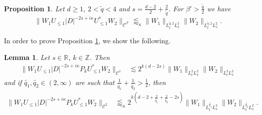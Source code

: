 \documentclass[a4paper]{amsart}
\numberwithin{equation}{section}%
\theoremstyle{plain}%
\newtheorem{lemma}[theorem]{Lemma}
\newtheorem{proposition}[theorem]{Proposition}
\theoremstyle{definition}
\theoremstyle{remark}%
\def\C{\mathcal{C}}
\def\C{\mathcal{C}}
\begin{document}
\begin{proposition}
\label{prop:Proposition_4.1}
Let $d\geq1$, $2<\widetilde{q}<4$ and $s=\frac{d-2}{2}+\frac{2}{\widetilde{q}}$. For $\beta'>\frac{\widetilde{q}}{2}$ we have 
\begin{equation*}
    \|W_1U_{\leq 1}|D|^{-2s+i\kappa}U_{\leq 1}^*W_2\|_{\C^{\beta'}}
\lessapprox_\kappa
    \|W_1\|_{L_t^{\widetilde{q},2}L_x^2}\|W_2\|_{L_t^{\widetilde{q},2}L_x^2}.
\end{equation*}
\end{proposition}
In order to prove Proposition \ref{prop:Proposition_4.1}, we show the following.
\begin{lemma} \label{l:freqlocal}
Let $s \in \mathbb{R}$, $k \in \mathbb{Z}$. Then 
\begin{align}\label{i:C1 loc}
    \|W_1U_{\leq 1}|D|^{-2s+i\kappa}P_kU_{\leq 1}^*W_2\|_{\C^1}
    & \lesssim
    2^{k(d-2s)}
    \|W_1\|_{L_t^{2}L_x^2}\|W_2\|_{L_t^{2}L_x^2}
\end{align}
and if $\widetilde{q_1},\widetilde{q_2}\in (2,\infty)$ are such that $\frac{1}{\widetilde{q_1}}+\frac{1}{\widetilde{q_2}}>\frac12$, then
\begin{align}\label{i:C2 loc}
    \|W_1U_{\leq 1}|D|^{-2s+i\kappa}P_kU_{\leq 1}^*W_2\|_{\C^2}
    & \lessapprox_\kappa
    2^{k(d-2+\frac{2}{\widetilde{q_1}}+\frac{2}{\widetilde{q_2}}-2s)}
    \|W_1\|_{L_t^{\widetilde{q_1}}L_x^2}\|W_2\|_{L_t^{\widetilde{q_2}}L_x^2}.
\end{align}
\end{lemma}
\end{document}
